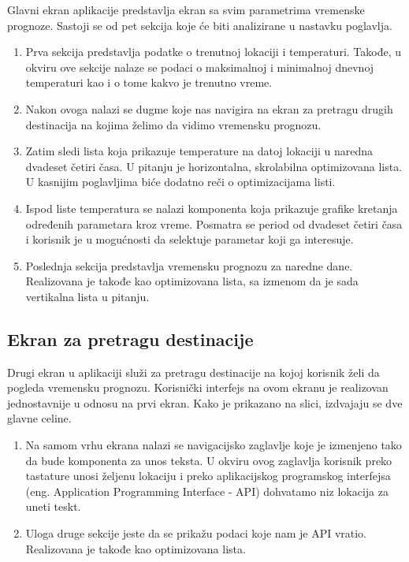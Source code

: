 \documentclass[12pt,oneside]{memoir}
\begin{document}
Glavni ekran aplikacije predstavlja ekran sa svim parametrima vremenske prognoze. Sastoji se od pet sekcija koje će biti analizirane u nastavku poglavlja.

\begin{enumerate}
    \item Prva sekcija predstavlja podatke o trenutnoj lokaciji i temperaturi. Takođe, u okviru ove sekcije nalaze se podaci o maksimalnoj i minimalnoj dnevnoj temperaturi kao i o tome kakvo je trenutno vreme.
    \item Nakon ovoga nalazi se dugme koje nas navigira na ekran za pretragu drugih destinacija na kojima želimo da vidimo vremensku prognozu.
    \item Zatim sledi lista koja prikazuje temperature na datoj lokaciji u naredna dvadeset četiri časa. U pitanju je horizontalna, skrolabilna optimizovana lista. U kasnijim poglavljima biće dodatno reči o optimizacijama listi.
    \item Ispod liste temperatura se nalazi komponenta koja prikazuje grafike kretanja određenih parametara kroz vreme. Posmatra se period od dvadeset četiri časa i korisnik je u mogućnosti da selektuje parametar koji ga interesuje.
    \item Poslednja sekcija predstavlja vremensku prognozu za naredne dane. Realizovana je takođe kao optimizovana lista, sa izmenom da je sada vertikalna lista u pitanju.
\end{enumerate}

\subsection{Ekran za pretragu destinacije}

Drugi ekran u aplikaciji služi za pretragu destinacije na kojoj korisnik želi da pogleda vremensku prognozu. Korisnički interfejs na ovom ekranu je realizovan jednostavnije u odnosu na prvi ekran. Kako je prikazano na slici, izdvajaju se dve glavne celine.

\begin{enumerate}
    \item Na samom vrhu ekrana nalazi se navigacijsko zaglavlje koje je izmenjeno tako da bude komponenta za unos teksta. U okviru ovog zaglavlja korisnik preko tastature unosi željenu lokaciju i preko aplikacijskog programskog interfejsa (eng. Application Programming Interface - API) dohvatamo niz lokacija za uneti teskt.
    \item Uloga druge sekcije jeste da se prikažu podaci koje nam je API vratio. Realizovana je takođe kao optimizovana lista.
\end{enumerate}
\end{document}
